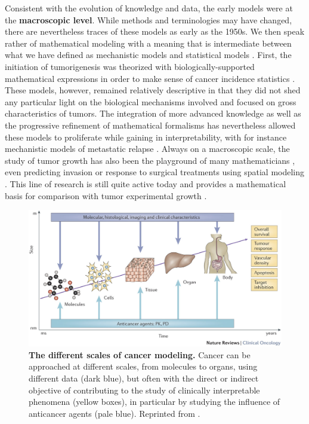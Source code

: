 \documentclass[a4paper,12pt,twoside,onecolumn,openright,final,oldfontcommands]{memoir}
\begin{document}
Consistent with the evolution of knowledge and data, the early models
were at the \textbf{macroscopic level}. While methods and terminologies
may have changed, there are nevertheless traces of these models as early
as the 1950s. We then speak rather of mathematical modeling with a
meaning that is intermediate between what we have defined as mechanistic
models and statistical models \citep{byrne2010dissecting}. First, the
initiation of tumorigenesis was theorized with biologically-supported
mathematical expressions in order to make sense of cancer incidence
statistics \citep{armitage1954age, knudson1971mutation}. These models,
however, remained relatively descriptive in that they did not shed any
particular light on the biological mechanisms involved and focused on
gross characteristics of tumors. The integration of more advanced
knowledge as well as the progressive refinement of mathematical
formalisms has nevertheless allowed these models to proliferate while
gaining in interpretability, with for instance mechanistic models of
metastatic relapse \citep{nicolo2020machine}. Always on a macroscopic
scale, the study of tumor growth has also been the playground of many
mathematicians \citep{araujo2004history, byrne2010dissecting}, even
predicting invasion or response to surgical treatments using spatial
modeling \citep{swanson2003virtual}. This line of research is still
quite active today and provides a mathematical basis for comparison with
tumor experimental growth \citep{benzekry2014classical}.

\begin{figure}

{\centering \includegraphics[width=0.9\linewidth]{fig/multiscale} 

}

\caption[The different scales of cancer modeling]{\textbf{The different scales of cancer
modeling.} Cancer can be approached at different scales, from molecules
to organs, using different data (dark blue), but often with the direct
or indirect objective of contributing to the study of clinically
interpretable phenomena (yellow boxes), in particular by studying the
influence of anticancer agents (pale blue). Reprinted from
\citet{barbolosi2016computational}.}\label{fig:multiscale}
\end{figure}
\end{document}
